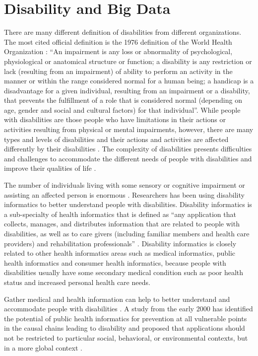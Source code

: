 \section{Disability and Big Data}
There are many different definition of disabilities from different organizations. The most cited official
definition is the 1976 definition of the World Health Organization \cite{Appleyard2005}: ``An impairment is
any loss or abnormality of psychological, physiological or anatomical structure or function; a disability
is any restriction or lack (resulting from an impairment) of ability to perform an activity in the manner
or within the range considered normal for a human being; a handicap is a disadvantage for a given
individual, resulting from an impairment or a disability, that prevents the fulfillment of a role that is
considered normal (depending on age, gender and social and cultural factors) for that individual''. While
people with disabilities are those people who have limitations in their actions or activities resulting
from physical or mental impairments, however, there are many types and levels of disabilities and their
actions and activities are affected differently by their disabilities \cite{Appleyard2005}. The complexity
of disabilities presents difficulties and challenges to accommodate the different needs of people with
disabilities and improve their qualities of life \cite{Datapop}. 

The number of individuals living with some sensory or cognitive impairment or assisting an affected person is enormous \cite{Riga13}. Researchers has been using disability informatics to better understand people with disabilities. Disability informatics is a sub-specialty of health informatics that is defined as ``any application that
collects, manages, and distributes information that are related to people with disabilities, as well as to
care givers (including familiar members and health care providers) and rehabilitation professionals''
\cite{Appleyard2005}. Disability informatics is closely related to other health informatics areas such as
medical informatics, public health informatics and consumer health informatics, because people with
disabilities usually have some secondary medical condition such as poor health status and increased
personal health care needs. 

Gather medical and health information can help to better understand and
accommodate people with disabilities \cite{Riga13}. A study from the early 2000 has identified the
potential of public health informatics for prevention at all vulnerable points in the causal chains leading
to disability and proposed that  applications should not be restricted to particular social, behavioral,
or environmental contexts, but in a more global context \cite{Yasnoff}.  

